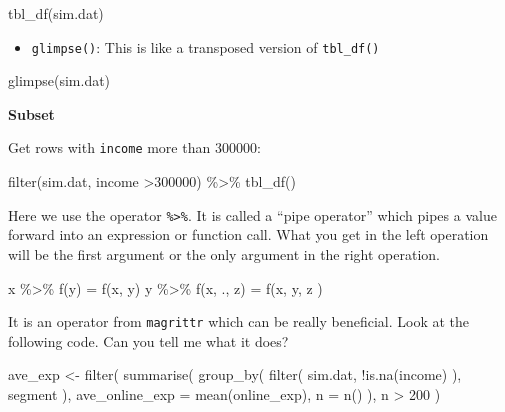 \documentclass[
  12pt,
]{krantz}
\makeatletter
\newenvironment{Shaded}{\begin{snugshade}}{\end{snugshade}}
\newcommand{\AttributeTok}[1]{\textcolor[rgb]{0.61,0.61,0.61}{#1}}
\newcommand{\DecValTok}[1]{\textcolor[rgb]{0.06,0.06,0.06}{#1}}
\newcommand{\FunctionTok}[1]{\textcolor[rgb]{0,0,0}{#1}}
\newcommand{\NormalTok}[1]{#1}
\newcommand{\OtherTok}[1]{\textcolor[rgb]{0.37,0.37,0.37}{#1}}
\newcommand{\SpecialCharTok}[1]{\textcolor[rgb]{0,0,0}{#1}}
\providecommand{\tightlist}{%
  \setlength{\itemsep}{0pt}\setlength{\parskip}{0pt}}
\newenvironment{kframe}{%
\medskip{}
\setlength{\fboxsep}{.8em}
 \def\at@end@of@kframe{}%
 \ifinner\ifhmode%
  \def\at@end@of@kframe{\end{minipage}}%
  \begin{minipage}{\columnwidth}%
 \fi\fi%
 \def\FrameCommand##1{\hskip\@totalleftmargin \hskip-\fboxsep
 \colorbox{shadecolor}{##1}\hskip-\fboxsep
     \hskip-\linewidth \hskip-\@totalleftmargin \hskip\columnwidth}%
 \MakeFramed {\advance\hsize-\width
   \@totalleftmargin\z@ \linewidth\hsize
   \@setminipage}}%
 {\par\unskip\endMakeFramed%
 \at@end@of@kframe}
\renewenvironment{Shaded}{\begin{kframe}}{\end{kframe}}
\makeatother
\begin{document}
\begin{Shaded}
\begin{Highlighting}[]
\FunctionTok{tbl\_df}\NormalTok{(sim.dat)}
\end{Highlighting}
\end{Shaded}

\begin{itemize}
\tightlist
\item
  \texttt{glimpse()}: This is like a transposed version of \texttt{tbl\_df()}
\end{itemize}

\begin{Shaded}
\begin{Highlighting}[]
\FunctionTok{glimpse}\NormalTok{(sim.dat)}
\end{Highlighting}
\end{Shaded}

\textbf{Subset}

Get rows with \texttt{income} more than 300000:

\begin{Shaded}
\begin{Highlighting}[]
\FunctionTok{filter}\NormalTok{(sim.dat, income }\SpecialCharTok{\textgreater{}}\DecValTok{300000}\NormalTok{) }\SpecialCharTok{\%\textgreater{}\%}
  \FunctionTok{tbl\_df}\NormalTok{()}
\end{Highlighting}
\end{Shaded}

Here we use the operator \texttt{\%\textgreater{}\%}. It is called a ``pipe operator'' which pipes a value forward into an expression or function call. What you get in the left operation will be the first argument or the only argument in the right operation.

\begin{Shaded}
\begin{Highlighting}[]
\NormalTok{x }\SpecialCharTok{\%\textgreater{}\%} \FunctionTok{f}\NormalTok{(y) }\OtherTok{=} \FunctionTok{f}\NormalTok{(x, y)}
\NormalTok{y }\SpecialCharTok{\%\textgreater{}\%} \FunctionTok{f}\NormalTok{(x, ., z) }\OtherTok{=} \FunctionTok{f}\NormalTok{(x, y, z )}
\end{Highlighting}
\end{Shaded}

It is an operator from \texttt{magrittr} which can be really beneficial. Look at the following code. Can you tell me what it does?

\begin{Shaded}
\begin{Highlighting}[]
\NormalTok{ave\_exp }\OtherTok{\textless{}{-}} \FunctionTok{filter}\NormalTok{( }
  \FunctionTok{summarise}\NormalTok{(}
    \FunctionTok{group\_by}\NormalTok{( }
      \FunctionTok{filter}\NormalTok{(}
\NormalTok{        sim.dat, }
        \SpecialCharTok{!}\FunctionTok{is.na}\NormalTok{(income)}
\NormalTok{      ), }
\NormalTok{      segment}
\NormalTok{    ), }
    \AttributeTok{ave\_online\_exp =} \FunctionTok{mean}\NormalTok{(online\_exp), }
    \AttributeTok{n =} \FunctionTok{n}\NormalTok{()}
\NormalTok{  ), }
\NormalTok{  n }\SpecialCharTok{\textgreater{}} \DecValTok{200}
\NormalTok{) }
\end{Highlighting}
\end{Shaded}
\end{document}
